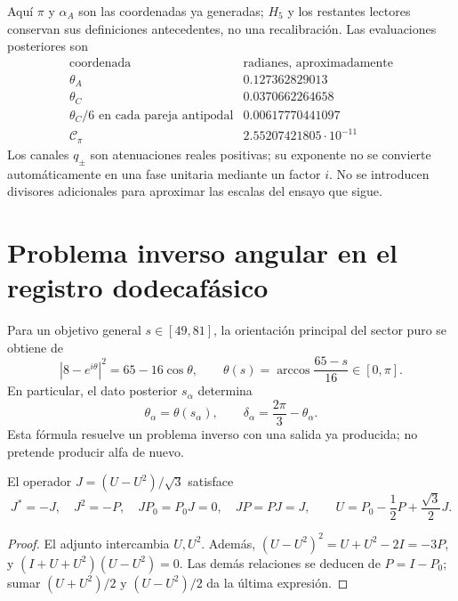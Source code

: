 Aquí \(\pi\) y \(\alpha_A\) son las coordenadas ya generadas;
\(H_5\) y los restantes lectores conservan sus definiciones
antecedentes, no una recalibración. Las evaluaciones posteriores son
\[
\begin{array}{c|c}
 \text{coordenada}&\text{radianes, aproximadamente}\\\hline
 \theta_A&0.127362829013\\
 \theta_C&0.0370662264658\\
 \theta_C/6\text{ en cada pareja antipodal}&0.00617770441097\\
 \mathcal C_\pi&2.55207421805\cdot10^{-11}
\end{array}
\]
Los canales \(q_\pm\) son atenuaciones reales positivas; su exponente
no se convierte automáticamente en una fase unitaria mediante un factor
\(i\). No se introducen divisores adicionales para aproximar las
escalas del ensayo que sigue.

\section{Problema inverso angular en el registro dodecafásico}
\label{x_reciprocidad:lib02:ensayo-angular}

Para un objetivo general \(s\in[49,81]\), la orientación principal
del sector puro se obtiene de
\[
 |8-e^{i\theta}|^2=65-16\cos\theta,
 \qquad \theta(s)=\arccos\frac{65-s}{16}\in[0,\pi].
\]
En particular, el dato posterior \(s_\alpha\) determina
\[
 \theta_\alpha=\theta(s_\alpha),\qquad
 \delta_\alpha=\frac{2\pi}{3}-\theta_\alpha.
\]
Esta fórmula resuelve un problema inverso con una salida ya producida;
no pretende producir alfa de nuevo.

\begin{lemma}
\label{x_reciprocidad:lib02:J}
El operador \(J=(U-U^2)/\sqrt3\) satisface
\[
 J^*=-J,\quad J^2=-P,\quad JP_0=P_0J=0,\quad JP=PJ=J,
 \qquad U=P_0-\frac12P+\frac{\sqrt3}{2}J.
\]
\end{lemma}
\begin{proof}
El adjunto intercambia \(U,U^2\). Además,
\((U-U^2)^2=U+U^2-2I=-3P\), y
\((I+U+U^2)(U-U^2)=0\). Las demás relaciones se deducen de
\(P=I-P_0\); sumar \((U+U^2)/2\) y \((U-U^2)/2\)
da la última expresión.
\end{proof}

